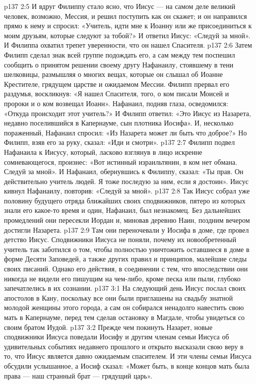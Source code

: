 \vs p137 2:5 И вдруг Филиппу стало ясно, что Иисус --- на самом деле великий человек, возможно, Мессия, и решил поступить как он скажет; и он направился прямо к нему и спросил: «Учитель, идти мне к Иоанну или же присоединиться к моим друзьям, которые следуют за тобой?» И ответил Иисус: «Следуй за мной». И Филиппа охватил трепет уверенности, что он нашел Спасителя.
\vs p137 2:6 \pc Затем Филипп сделал знак всей группе подождать его, а сам между тем поспешил сообщить о принятом решении своему другу Нафанаилу, стоявшему в тени шелковицы, размышляя о многих вещах, которые он слышал об Иоанне Крестителе, грядущем царстве и ожидаемом Мессии. Филипп прервал его раздумья, воскликнув: «Я нашел Спасителя, того, о ком писали Моисей и пророки и о ком возвещал Иоанн». Нафанаил, подняв глаза, осведомился: «Откуда происходит этот учитель?» И Филипп ответил: «Это Иисус из Назарета, недавно поселившийся в Капернауме, сын плотника Иосифа». И, несколько пораженный, Нафанаил спросил: «Из Назарета может ли быть что доброе?» Но Филипп, взяв его за руку, сказал: «Иди и смотри».
\vs p137 2:7 Филипп подвел Нафанаила к Иисусу, который, ласково взглянув в лицо искренне сомневающегося, произнес: «Вот истинный израильтянин, в ком нет обмана. Следуй за мной». И Нафанаил, обернувшись к Филиппу, сказал: «Ты прав. Он действительно учитель людей. Я тоже последую за ним, если я достоин». Иисус кивнул Нафанаилу, повторив: «Следуй за мной».
\vs p137 2:8 \pc Так Иисус собрал уже половину будущего отряда ближайших своих сподвижников, пятеро из которых знали его какое\hyp{}то время и один, Нафанаил, был незнакомец. Без дальнейших промедлений они пересекли Иордан и, миновав деревню Наин, поздним вечером достигли Назарета.
\vs p137 2:9 Там они переночевали у Иосифа в доме, где провел детство Иисус. Сподвижники Иисуса не поняли, почему их новообретенный учитель так заботился о том, чтобы полностью уничтожить оставшиеся в доме в форме Десяти Заповедей, а также других правил и принципов, малейшие следы своих писаний. Однако его действия, в соединении с тем, что впоследствии они никогда не видели его пишущим на чем\hyp{}либо, кроме песка или пыли, глубоко запечатлелись в их сознании.
\vs p137 3:1 На следующий день Иисус послал своих апостолов в Кану, поскольку все они были приглашены на свадьбу знатной молодой женщины этого города, а сам он собирался ненадолго навестить свою мать в Капернауме, перед тем сделав остановку в Магдале, чтобы увидеться со своим братом Иудой.
\vs p137 3:2 Прежде чем покинуть Назарет, новые сподвижники Иисуса поведали Иосифу и другим членам семьи Иисуса об удивительных событиях недавнего прошлого и открыто высказали свою веру в то, что Иисус является давно ожидаемым спасителем. И эти члены семьи Иисуса обсудили услышанное, а Иосиф сказал: «Может быть, в конце концов мать была права --- наш странный брат --- грядущий царь».
